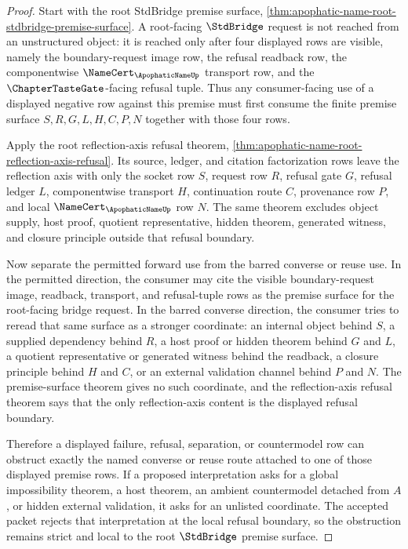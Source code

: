 \begin{proof}
Start with the root StdBridge premise surface, \autoref{thm:apophatic-name-root-stdbridge-premise-surface}. A root-facing $\StdBridge$ request is not reached from an unstructured object: it is reached only after four displayed rows are visible, namely the boundary-request image row, the refusal readback row, the componentwise $\NameCert_{\ApophaticNameUp}$ transport row, and the $\ChapterTasteGate$-facing refusal tuple. Thus any consumer-facing use of a displayed negative row against this premise must first consume the finite premise surface $S,R,G,L,H,C,P,N$ together with those four rows.

Apply the root reflection-axis refusal theorem, \autoref{thm:apophatic-name-root-reflection-axis-refusal}. Its source, ledger, and citation factorization rows leave the reflection axis with only the socket row $S$, request row $R$, refusal gate $G$, refusal ledger $L$, componentwise transport $H$, continuation route $C$, provenance row $P$, and local $\NameCert_{\ApophaticNameUp}$ row $N$. The same theorem excludes object supply, host proof, quotient representative, hidden theorem, generated witness, and closure principle outside that refusal boundary.

Now separate the permitted forward use from the barred converse or reuse use. In the permitted direction, the consumer may cite the visible boundary-request image, readback, transport, and refusal-tuple rows as the premise surface for the root-facing bridge request. In the barred converse direction, the consumer tries to reread that same surface as a stronger coordinate: an internal object behind $S$, a supplied dependency behind $R$, a host proof or hidden theorem behind $G$ and $L$, a quotient representative or generated witness behind the readback, a closure principle behind $H$ and $C$, or an external validation channel behind $P$ and $N$. The premise-surface theorem gives no such coordinate, and the reflection-axis refusal theorem says that the only reflection-axis content is the displayed refusal boundary.

Therefore a displayed failure, refusal, separation, or countermodel row can obstruct exactly the named converse or reuse route attached to one of those displayed premise rows. If a proposed interpretation asks for a global impossibility theorem, a host theorem, an ambient countermodel detached from $A$, or hidden external validation, it asks for an unlisted coordinate. The accepted packet rejects that interpretation at the local refusal boundary, so the obstruction remains strict and local to the root $\StdBridge$ premise surface.
\end{proof}

